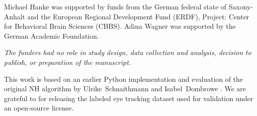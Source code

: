 Michael Hanke was supported by funds from the German federal state of
Saxony-Anhalt and the European Regional Development Fund (ERDF),
Project: Center for Behavioral Brain Sciences (CBBS).
Adina Wagner was supported by the German Academic Foundation.

\textit{The funders had no role in study design, data collection and analysis,
decision to publish, or preparation of the manuscript.}


\begin{acknowledgements}


This work is based on an earlier Python implementation and evaluation of the
original NH algorithm by Ulrike~Schnaithmann and Isabel~Dombrowe
\citep{Sch2017}.  We are grateful to \cite{Andersson2017} for releasing the
labeled eye tracking dataset used for validation under an open-source license.

\end{acknowledgements}








